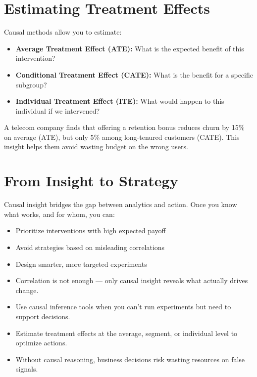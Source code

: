 \documentclass[12pt,openany]{book}
\begin{document}
\section{Estimating Treatment Effects}

Causal methods allow you to estimate:
\begin{itemize}
  \item \textbf{Average Treatment Effect (ATE):} What is the expected benefit of this intervention?
  \item \textbf{Conditional Treatment Effect (CATE):} What is the benefit for a specific subgroup?
  \item \textbf{Individual Treatment Effect (ITE):} What would happen to this individual if we intervened?
\end{itemize}

\begin{examplebox}
A telecom company finds that offering a retention bonus reduces churn by 15\% on average (ATE), but only 5\% among long-tenured customers (CATE). This insight helps them avoid wasting budget on the wrong users.
\end{examplebox}

\section{From Insight to Strategy}

Causal insight bridges the gap between analytics and action. Once you know what works, and for whom, you can:
\begin{itemize}
  \item Prioritize interventions with high expected payoff
  \item Avoid strategies based on misleading correlations
  \item Design smarter, more targeted experiments
\end{itemize}

\begin{summarybox}
\begin{itemize}
  \item Correlation is not enough — only causal insight reveals what actually drives change.
  \item Use causal inference tools when you can’t run experiments but need to support decisions.
  \item Estimate treatment effects at the average, segment, or individual level to optimize actions.
  \item Without causal reasoning, business decisions risk wasting resources on false signals.
\end{itemize}
\end{summarybox}
\end{document}

